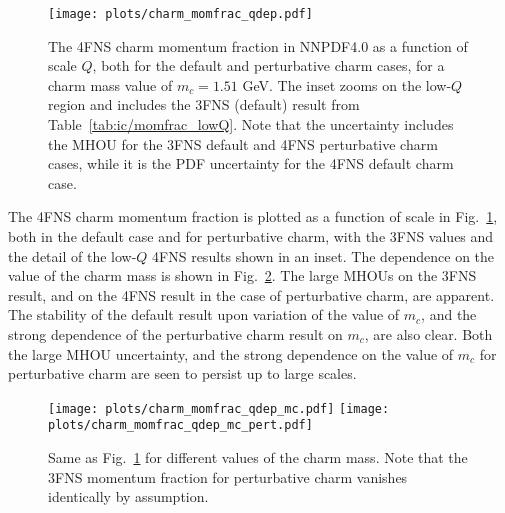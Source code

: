 \begin{figure}[h]
  \begin{center}
     \texttt{[image: plots/charm\_momfrac\_qdep.pdf]}
    \caption{\small 
      The 4FNS charm momentum fraction in NNPDF4.0 as a function of scale $Q$,
      both for the default and perturbative charm cases,
      for a charm mass value of $m_c=1.51$ GeV.
     The inset zooms on the low-$Q$ region and includes the 3FNS
     (default) result
     from Table~\ref{tab:ic/momfrac_lowQ}. 
     Note that the uncertainty includes the MHOU for the 3FNS default
     and 4FNS perturbative charm cases, while it is the PDF
     uncertainty for the 4FNS default charm case.
  \label{fig:ic/comparison_IC_models} }
\end{center}
\end{figure}

The 4FNS charm momentum fraction is plotted as a function of scale
in Fig.~\ref{fig:ic/comparison_IC_models}, both in the default case and
for perturbative charm, with the 3FNS values and the detail of the low-$Q$ 
4FNS results shown in an inset.
%
The dependence on the value of the charm mass
is shown in Fig.~\ref{fig:ic/charm_momfrac_qdep_mc}.
The large MHOUs on the 3FNS result, and on the 
4FNS result in the case of perturbative charm, are apparent.
The stability of the default result upon variation of  the value of
$m_c$, and the strong dependence of the perturbative charm result on
$m_c$, are  also clear.
Both the large MHOU uncertainty, and the strong dependence on
the value of $m_c$
for perturbative charm are seen to persist up to large scales.


\begin{figure}[t]
  \begin{center}
    \texttt{[image: plots/charm\_momfrac\_qdep\_mc.pdf]}
    \texttt{[image: plots/charm\_momfrac\_qdep\_mc\_pert.pdf]}
    \caption{\small
    Same as Fig.~\ref{fig:ic/comparison_IC_models} for different values
    of the charm mass. Note that the 3FNS momentum fraction for
     perturbative charm vanishes identically by assumption.
   \label{fig:ic/charm_momfrac_qdep_mc} }
\end{center}
\end{figure}

